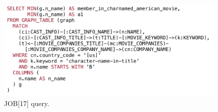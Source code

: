 \begin{figure}[ht]
    \centering
    \includegraphics[width=\linewidth]{./figures/job17a-query.pdf}
    \caption{JOB[17] query.}
    \label{fig:job17-query}
\end{figure}


